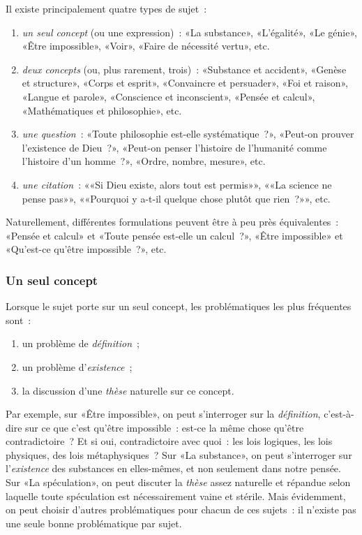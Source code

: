 \documentclass[a4paper,11pt]{article}
\newcommand{\cad}{c'est-à-dire}
\begin{document}
Il existe principalement quatre types de sujet~: 
\begin{enumerate}
\item \emph{un seul concept} (ou une expression)~: «La substance»,
  «L'égalité», «Le génie», «Être impossible», «Voir», «Faire de
  nécessité vertu», etc.
\item \emph{deux concepts} (ou, plus rarement, trois)~: «Substance et
  accident», «Genèse et structure», «Corps et esprit», «Convaincre et
  persuader», «Foi et raison», «Langue et parole», «Conscience et
  inconscient», «Pensée et calcul», «Mathématiques et philosophie», etc.
\item \emph{une question}~: «Toute philosophie est-elle systématique~?»,
  «Peut-on prouver l'existence de Dieu~?», «Peut-on penser l'histoire de
  l'humanité comme l'histoire d'un homme~?», «Ordre, nombre, mesure»,
  etc.
\item \emph{une citation}~: ««Si Dieu existe, alors tout est permis»»,
  ««La science ne pense pas»», ««Pourquoi y a-t-il quelque chose plutôt
  que rien~?»», etc.
\end{enumerate}
Naturellement, différentes formulations peuvent être à peu près
équivalentes~: «Pensée et calcul» et «Toute pensée est-elle un
calcul~?», «Être impossible» et «Qu'est-ce qu'être impossible~?», etc.



\subsubsection{Un seul concept}

Lorsque le sujet porte sur un seul concept, les problématiques les plus
fréquentes sont~:
\begin{enumerate}
\item un problème de \emph{définition}~;
\item un problème d'\emph{existence}~;
\item la discussion d'une \emph{thèse} naturelle sur ce concept.
\end{enumerate}
Par exemple, sur «Être impossible», on peut s'interroger sur la
\emph{définition}, \cad{} sur ce que c'est qu'être impossible~: est-ce
la même chose qu'être contradictoire~?  Et si oui, contradictoire avec
quoi~: les lois logiques, les lois physiques, des lois métaphysiques~?
Sur «La substance», on peut s'interroger sur l'\emph{existence} des
substances en elles-mêmes, et non seulement dans notre pensée. Sur «La
spéculation», on peut discuter la \emph{thèse} assez naturelle et
répandue selon laquelle toute spéculation est nécessairement vaine et
stérile. Mais évidemment, on peut choisir d'autres problématiques pour
chacun de ces sujets~: il n'existe pas une seule bonne problématique par
sujet.
\end{document}
